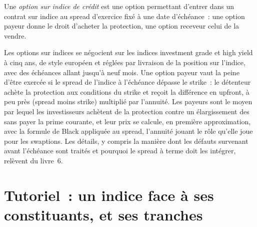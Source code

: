 \begin{definition}\label{def:m2:credit-indices-and-tranches:option}
Une \emph{option sur indice de crédit} est une option permettant
d'entrer dans un contrat sur indice au spread d'exercice fixé à une date d'échéance~: une option
payeur donne le droit d'acheter la protection, une option receveur celui de la vendre.
\end{definition}

Les options sur indices se négocient sur les indices investment grade et high yield à cinq ans, de style
européen et réglées par livraison de la position sur l'indice, avec des échéances allant jusqu'à neuf
mois. Une option payeur vaut la peine d'être exercée si le spread de l'indice à l'échéance dépasse le strike~:
le détenteur achète la protection aux conditions du strike et reçoit la différence en upfront,
à peu près (spread moins strike) multiplié par l'annuité. Les payeurs sont le moyen par lequel les
investisseurs achètent de la protection contre un élargissement des  sans payer la prime courante,
et leur prix se calcule, en première approximation, avec la formule de Black appliquée au spread,
l'annuité jouant le rôle qu'elle joue pour les swaptions. Les détails, y compris la manière dont
les défauts survenant avant l'échéance sont traités et pourquoi le spread à terme doit les intégrer, relèvent
du livre~6.

\section{Tutoriel~: un indice face à ses constituants, et ses tranches}\label{tut:m2:credit-indices-and-tranches:tranche}

